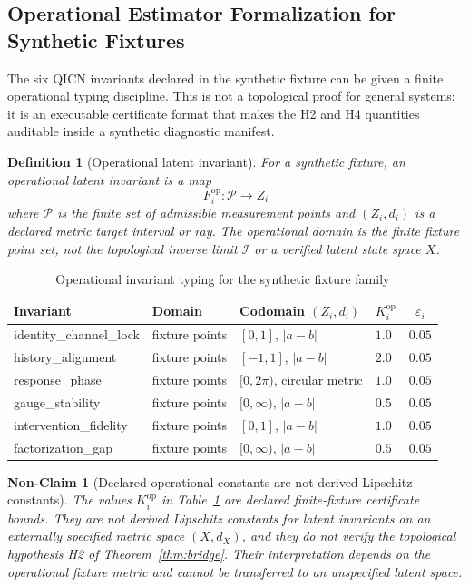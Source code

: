 \documentclass[11pt]{article}
\newtheorem{definition}{Definition}
\newtheorem{nonclaim}{Non-Claim}
\begin{document}
\subsection{Operational Estimator Formalization for Synthetic Fixtures}
\label{sec:operational-estimators}

The six QICN invariants declared in the synthetic fixture can be given a finite operational typing discipline. This is not a topological proof for general systems; it is an executable certificate format that makes the H2 and H4 quantities auditable inside a synthetic diagnostic manifest.

\begin{definition}[Operational latent invariant]\label{def:operational-invariant}
For a synthetic fixture, an \emph{operational latent invariant} is a map
\[
F_i^{\mathrm{op}}\colon\mathcal{P}\to Z_i
\]
where $\mathcal{P}$ is the finite set of admissible measurement points and $(Z_i,d_i)$ is a declared metric target interval or ray. The operational domain is the finite fixture point set, not the topological inverse limit $\mathcal{I}$ or a verified latent state space $X$.
\end{definition}

\begin{table}[h]
\centering
\caption{Operational invariant typing for the synthetic fixture family}
\label{tab:operational-invariants}
\begin{tabular}{llllc}
\hline
Invariant & Domain & Codomain $(Z_i,d_i)$ & $K_i^{\mathrm{op}}$ & $\varepsilon_i$ \\
\hline
identity\_channel\_lock & fixture points & $[0,1]$, $|a-b|$ & $1.0$ & $0.05$ \\
history\_alignment & fixture points & $[-1,1]$, $|a-b|$ & $2.0$ & $0.05$ \\
response\_phase & fixture points & $[0,2\pi)$, circular metric & $1.0$ & $0.05$ \\
gauge\_stability & fixture points & $[0,\infty)$, $|a-b|$ & $0.5$ & $0.05$ \\
intervention\_fidelity & fixture points & $[0,1]$, $|a-b|$ & $1.0$ & $0.05$ \\
factorization\_gap & fixture points & $[0,\infty)$, $|a-b|$ & $0.5$ & $0.05$ \\
\hline
\end{tabular}
\end{table}

\begin{nonclaim}[Declared operational constants are not derived Lipschitz constants]\label{nonclaim:declared-op-constants}
The values $K_i^{\mathrm{op}}$ in Table~\ref{tab:operational-invariants} are declared finite-fixture certificate bounds. They are not derived Lipschitz constants for latent invariants on an externally specified metric space $(X,d_X)$, and they do not verify the topological hypothesis H2 of Theorem~\ref{thm:bridge}. Their interpretation depends on the operational fixture metric and cannot be transferred to an unspecified latent space.
\end{nonclaim}
\end{document}
